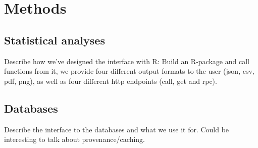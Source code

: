 
\section*{Methods}

%

\subsection*{Statistical analyses}
Describe how we've designed the interface with R: Build an R-package and call
functions from it, we provide four different output formats to the user
 (json, csv, pdf, png),  as well as four different http endpoints (call, get and
rpc).

%
\subsection*{Databases}
Describe the interface to the databases and what we use it for. Could be
interesting to talk about provenance/caching.

